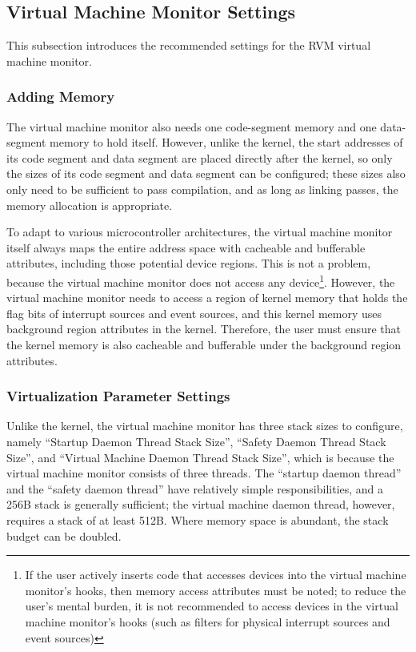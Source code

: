 \subsection{Virtual Machine Monitor Settings}\label{subsec:6-5-3}

This subsection introduces the recommended settings for the RVM virtual machine monitor.

\subsubsection{Adding Memory}\label{subsubsec:6-5-3-1}

The virtual machine monitor also needs one code-segment memory and one data-segment memory to hold itself. However, unlike the kernel, the start addresses of its code segment and data segment are placed directly after the kernel, so only the sizes of its code segment and data segment can be configured; these sizes also only need to be sufficient to pass compilation, and as long as linking passes, the memory allocation is appropriate.

To adapt to various microcontroller architectures, the virtual machine monitor itself always maps the entire address space with cacheable and bufferable attributes, including those potential device regions. This is not a problem, because the virtual machine monitor does not access any device\footnote{If the user actively inserts code that accesses devices into the virtual machine monitor's hooks, then memory access attributes must be noted; to reduce the user's mental burden, it is not recommended to access devices in the virtual machine monitor's hooks (such as filters for physical interrupt sources and event sources)}. However, the virtual machine monitor needs to access a region of kernel memory that holds the flag bits of interrupt sources and event sources, and this kernel memory uses background region attributes in the kernel. Therefore, the user must ensure that the kernel memory is also cacheable and bufferable under the background region attributes.

\subsubsection{Virtualization Parameter Settings}\label{subsubsec:6-5-3-2}

Unlike the kernel, the virtual machine monitor has three stack sizes to configure, namely ``Startup Daemon Thread Stack Size'', ``Safety Daemon Thread Stack Size'', and ``Virtual Machine Daemon Thread Stack Size'', which is because the virtual machine monitor consists of three threads. The ``startup daemon thread'' and the ``safety daemon thread'' have relatively simple responsibilities, and a 256B stack is generally sufficient; the virtual machine daemon thread, however, requires a stack of at least 512B. Where memory space is abundant, the stack budget can be doubled.

